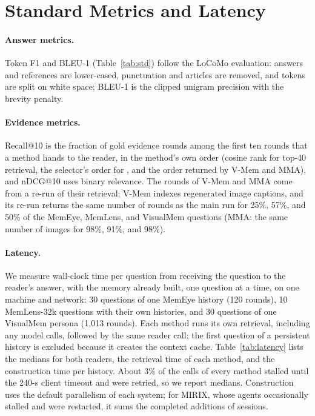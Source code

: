 \section{Standard Metrics and Latency}
\label{app:latency}



\paragraph{Answer metrics.} Token F1 and BLEU-1 (Table~\ref{tab:std}) follow the LoCoMo evaluation: answers and references are lower-cased, punctuation and articles are removed, and tokens are split on white space; BLEU-1 is the clipped unigram precision with the brevity penalty.

\paragraph{Evidence metrics.} Recall@10 is the fraction of gold evidence rounds among the first ten rounds that a method hands to the reader, in the method's own order (cosine rank for top-40 retrieval, the selector's order for \vgs{}, and the order returned by V-Mem and MMA), and nDCG@10 uses binary relevance. The rounds of V-Mem and MMA come from a re-run of their retrieval; V-Mem indexes regenerated image captions, and its re-run returns the same number of rounds as the main run for 25\%, 57\%, and 50\% of the MemEye, MemLens, and VisualMem questions (MMA: the same number of images for 98\%, 91\%, and 98\%).

\paragraph{Latency.} We measure wall-clock time per question from receiving the question to the reader's answer, with the memory already built, one question at a time, on one machine and network: 30 questions of one MemEye history (120 rounds), 10 MemLens-32k questions with their own histories, and 30 questions of one VisualMem persona (1,013 rounds). Each method runs its own retrieval, including any model calls, followed by the same reader call; the first question of a persistent history is excluded because it creates the context cache. Table~\ref{tab:latency} lists the medians for both readers, the retrieval time of each method, and the construction time per history. About 3\% of the calls of every method stalled until the 240-s client timeout and were retried, so we report medians. Construction uses the default parallelism of each system; for MIRIX, whose agents occasionally stalled and were restarted, it sums the completed additions of sessions.

